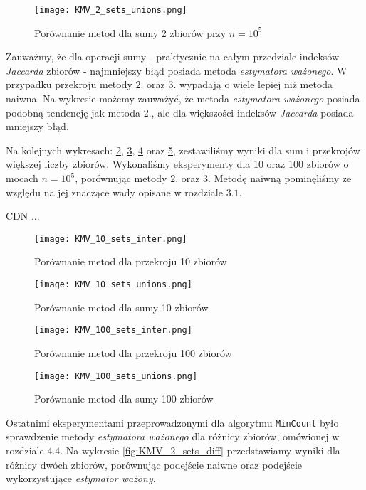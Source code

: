 \begin{figure}[h!]
    \texttt{[image: KMV\_2\_sets\_unions.png]}
    \centering
    \caption{Porównanie metod dla sumy 2 zbiorów przy $n=10^5$}
    \label{fig:KMV_2sets_unions}
\end{figure}

Zauważmy, że dla operacji sumy - praktycznie na całym przedziale indeksów \textit{Jaccarda} zbiorów - najmniejszy błąd posiada metoda \textit{estymatora ważonego}. W przypadku przekroju metody $2.$ oraz $3.$ wypadają o wiele lepiej niż metoda naiwna. Na wykresie możemy zauważyć, że metoda \textit{estymatora ważonego} posiada podobną tendencję jak metoda $2.$, ale dla większości indeksów \textit{Jaccarda} posiada mniejszy błąd.

Na kolejnych wykresach: \ref{fig:KMV_10sets_inter}, \ref{fig:KMV_10sets_unions}, \ref{fig:KMV_100sets_inter} oraz \ref{fig:KMV_100sets_unions}, zestawiliśmy wyniki dla sum i przekrojów większej liczby zbiorów. Wykonaliśmy eksperymenty dla 10 oraz 100 zbiorów o mocach $n = 10^5$, porównując metody $2.$ oraz $3.$ Metodę naiwną pominęliśmy ze względu na jej znaczące wady opisane w rozdziale $3.1$. 

CDN ...

\begin{figure}[h!]
    \texttt{[image: KMV\_10\_sets\_inter.png]}
    \centering
    \caption{Porównanie metod dla przekroju 10 zbiorów}
    \label{fig:KMV_10sets_inter}
\end{figure}

\begin{figure}[h!]
    \texttt{[image: KMV\_10\_sets\_unions.png]}
    \centering
    \caption{Porównanie metod dla sumy 10 zbiorów}
    \label{fig:KMV_10sets_unions}
\end{figure}

\begin{figure}[h!]
    \texttt{[image: KMV\_100\_sets\_inter.png]}
    \centering
    \caption{Porównanie metod dla przekroju 100 zbiorów}
    \label{fig:KMV_100sets_inter}
\end{figure}

\begin{figure}[h!]
    \texttt{[image: KMV\_100\_sets\_unions.png]}
    \centering
    \caption{Porównanie metod dla sumy 100 zbiorów}
    \label{fig:KMV_100sets_unions}
\end{figure}

Ostatnimi eksperymentami przeprowadzonymi dla algorytmu \texttt{MinCount} było sprawdzenie metody \textit{estymatora ważonego} dla różnicy zbiorów, omówionej w rozdziale $4.4$. Na wykresie \ref{fig:KMV_2_sets_diff} przedstawiamy wyniki dla różnicy dwóch zbiorów, porównując podejście naiwne oraz podejście wykorzystujące \textit{estymator ważony}.

